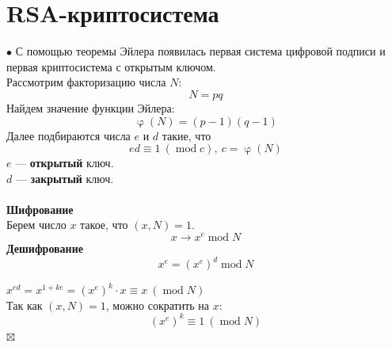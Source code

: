\documentclass[a4paper, 12pt]{article}
\newenvironment{Proof}
{\par\noindent{$\blacklozenge$}}
{\hfill$\scriptstyle\boxtimes$}
\renewcommand{\mod}{\operatorname{mod}}
\renewcommand{\varphi}{\upvarphi}
\begin{document}
    \section{RSA-криптосистема}
    $\bullet$ С помощью теоремы Эйлера появилась первая система цифровой подписи и первая криптосистема с открытым ключом.\\
    Рассмотрим факторизацию числа $N$:
    $$N=pq$$
    Найдем значение функции Эйлера:
    $$\varphi(N)=(p-1)(q-1)$$
    Далее подбираются числа $e$ и $d$ такие, что
    $$ed \equiv 1 \ (\mod c), \ c=\varphi(N)$$
    $e$ --- \textbf{открытый} ключ.\\
    $d$ --- \textbf{закрытый} ключ.\\\\
    \textbf{Шифрование}\\
    Берем число $x$ такое, что $(x,N)=1$.
    $$x \rightarrow x^e \mod N$$
    \textbf{Дешифрование}
    $$x^e = (x^e)^d \mod N$$
    \begin{Proof}
    $x^{ed} = x^{1+ke} = (x^e)^k\cdot x \equiv x \ (\mod N)$\\
    Так как $(x,N)=1$, можно сократить на $x$:
    $$(x^e)^k \equiv 1 \ (\mod N)$$
    \end{Proof}
\end{document}
